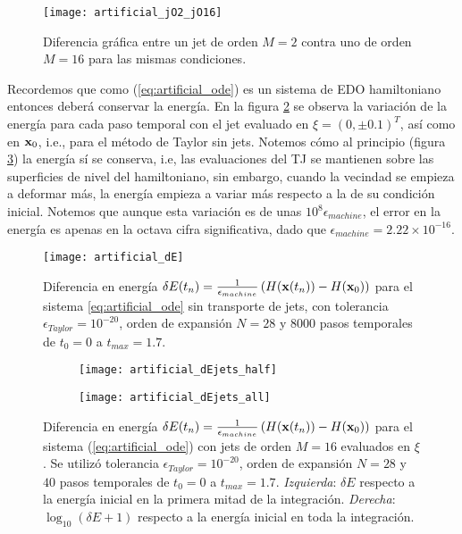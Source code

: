 \begin{figure}[h!]
 \centering
 \texttt{[image: artificial\_jO2\_jO16]}
 \caption{Diferencia gráfica entre un jet de orden $M=2$ contra uno de orden $M=16$ para las mismas condiciones.}
 \label{fig:artificial_jO2_jO16}
\end{figure}

Recordemos que como (\ref{eq:artificial_ode}) es un sistema de EDO hamiltoniano entonces deberá conservar la energía. En la figura \ref{fig:artificial_dE} se observa la variación de la energía para cada paso temporal con el jet evaluado en $\xi = (0,\pm 0.1)^T$, así como en $\mathbf{x}_0$, i.e., para el método de Taylor sin jets. Notemos cómo al principio (figura \ref{fig:artificial_dEjets_half}) la energía sí se conserva, i.e, las evaluaciones del TJ se mantienen sobre las superficies de nivel del hamiltoniano, sin embargo, cuando la vecindad se empieza a deformar más, la energía empieza a variar más respecto a la de su condición inicial. Notemos que aunque esta variación es de unas $10^8 \epsilon_{machine}$, el error en la energía es apenas en la octava cifra significativa, dado que $\epsilon_{machine} = 2.22\times 10^{-16}$.

\begin{figure}[h!]
 \centering
 \texttt{[image: artificial\_dE]}
 \caption{Diferencia en energía $\delta E(t_n) = \frac{1}{\epsilon_{machine}} \left( H(\mathbf{x}(t_n)) - H(\mathbf{x}_0) \right)$ para el sistema \ref{eq:artificial_ode} sin transporte de jets, con tolerancia $\epsilon_{Taylor} = 10^{-20}$, orden de expansión $N = 28$ y $8000$ pasos temporales de $t_0 = 0$ a $t_{max} = 1.7$.}
 \label{fig:artificial_dE}
\end{figure}

\begin{figure}[h!]
\centering
\begin{subfigure}{0.49\textwidth}
	\centering
	\texttt{[image: artificial\_dEjets\_half]}
	\label{fig:artificial_dEjets_half}
\end{subfigure}
%
\begin{subfigure}{0.49\textwidth}
	\centering
	\texttt{[image: artificial\_dEjets\_all]}
	\label{fig:artificial_dEjets_all}
\end{subfigure}
\caption{Diferencia en energía $\delta E(t_n) = \frac{1}{\epsilon_{machine}} \left( H(\mathbf{x}(t_n)) - H(\mathbf{x}_0) \right)$ para el sistema (\ref{eq:artificial_ode}) con jets de orden $M=16$ evaluados en $\xi$. Se utilizó tolerancia $\epsilon_{Taylor} = 10^{-20}$, orden de expansión $N = 28$ y $40$ pasos temporales de $t_0 = 0$ a $t_{max} = 1.7$. \textit{Izquierda}: $\delta E$ respecto a la energía inicial en la primera mitad de la integración. \textit{Derecha}:  $\log_10(\delta E + 1)$ respecto a la energía inicial en toda la integración. }
\label{fig:artificial_dEjets}
\end{figure}


